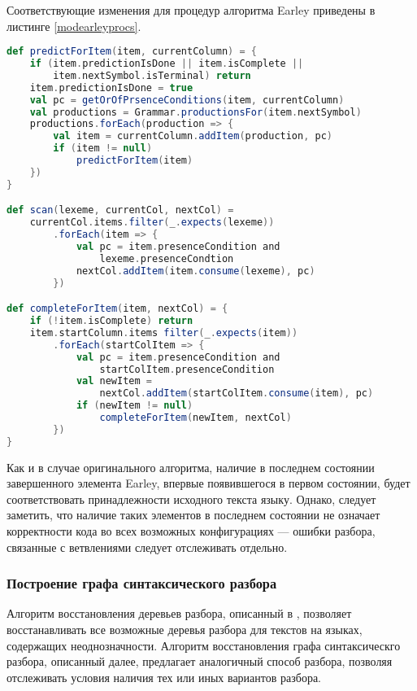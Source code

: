 Соответствующие изменения для процедур алгоритма Earley приведены в листинге \ref{modearleyprocs}.

\begin{minipage}{\linewidth}
\begin{lstlisting}[caption={Псевдокод модифицированных процедур алгоритма Earley},language=Scala,label=modearleyprocs]
def predictForItem(item, currentColumn) = {
	if (item.predictionIsDone || item.isComplete || 
		item.nextSymbol.isTerminal) return
	item.predictionIsDone = true
	val pc = getOrOfPrsenceConditions(item, currentColumn)
	val productions = Grammar.productionsFor(item.nextSymbol)
	productions.forEach(production => {
		val item = currentColumn.addItem(production, pc)
		if (item != null)
			predictForItem(item)
	})
}

def scan(lexeme, currentCol, nextCol) = 
	currentCol.items.filter(_.expects(lexeme))
		.forEach(item => {
			val pc = item.presenceCondition and
				lexeme.presenceCondtion
			nextCol.addItem(item.consume(lexeme), pc)
		})

def completeForItem(item, nextCol) = {
	if (!item.isComplete) return
	item.startColumn.items filter(_.expects(item))
		.forEach(startColItem => {
			val pc = item.presenceCondition and 
				startColItem.presenceCondition
			val newItem = 
				nextCol.addItem(startColItem.consume(item), pc)
			if (newItem != null)
				completeForItem(newItem, nextCol)		
		})
}
\end{lstlisting}
\end{minipage}

Как и в случае оригинального алгоритма, наличие в последнем состоянии завершенного элемента Earley, впервые появившегося в первом состоянии, будет соответствовать принадлежности исходного текста языку. Однако, следует заметить, что наличие таких элементов в последнем состоянии не означает корректности кода во всех возможных конфигурациях --- ошибки разбора, связанные с ветвлениями следует отслеживать отдельно.

\subsubsection{Построение графа синтаксического разбора}

Алгоритм восстановления деревьев разбора, описанный в \cite{recognizertoparser}, позволяет восстанавливать все возможные деревья разбора для текстов на языках, содержащих неоднозначности. Алгоритм восстановления графа синтаксическго разбора, описанный далее, предлагает аналогичный способ разбора, позволяя отслеживать условия наличия тех или иных вариантов разбора.

